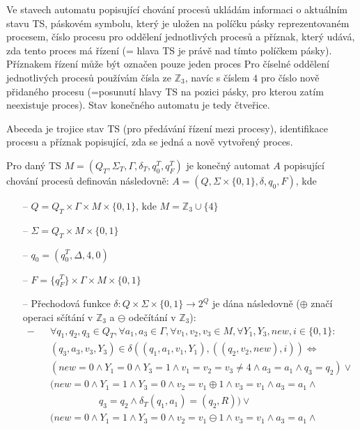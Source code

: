\documentclass[a4paper,12pt]{article}
\begin{document}
\begin{enumerate}[label=\textbf{\arabic*}.]
 Ve stavech automatu popisující chování procesů ukládám informaci o aktuálním stavu TS, páskovém 
 symbolu, který je uložen na políčku pásky reprezentovaném procesem, číslo procesu pro oddělení jednotlivých procesů a příznak, který 
 udává, zda tento proces má řízení (= hlava TS je právě nad tímto políčkem pásky).
 Příznakem řízení může být označen pouze jeden proces
 Pro číselné oddělení jednotlivých procesů používám čísla ze $\mathbb{Z}_3$, navíc s číslem $4$ pro 
 číslo nově přidaného procesu (=posunutí hlavy TS na pozici pásky, pro kterou zatím neexistuje proces). Stav konečného
 automatu je tedy čtveřice.
 
 Abeceda je trojice stav TS (pro předávání řízení mezi procesy), identifikace procesu a příznak popisující, zda
 se jedná a nově vytvořený proces.

 Pro daný TS $M = (Q_{T}, \Sigma_{T}, \Gamma, \delta_T, q^T_0, q^T_F)$ je konečný automat $A$ popisující chování procesů
 definován následovně: $A = (Q, \Sigma\times\{0,1\}, \delta, q_0, F)$, kde 
 \begin{itemize}
  \item[--] $Q = Q_{T}\times\Gamma\times M\times\{0,1\}$, kde $M = \mathbb{Z}_3\cup \{4\}$
  \item[--] $\Sigma = Q_T\times M\times\{0,1\}$
  \item[--] $q_0 = (q^T_0, \Delta, 4, 0)$
  \item[--] $F = \{q^T_F\}\times\Gamma\times M\times\{0,1\}$
  \item[--] Přechodová funkce $\delta: Q\times\Sigma\times\{0,1\}\rightarrow 2^Q$ je dána následovně ($\oplus$ značí operaci sčítání v $\mathbb{Z}_3$
   a $\ominus$ odečítání v $\mathbb{Z}_3$):
  \begin{eqnarray*}-
    &&\forall q_1, q_2, q_3 \in Q_T, \forall a_1, a_3\in\Gamma,\forall v_1, v_2, v_3\in M, \forall Y_1, Y_3, new, i \in \{0,1\}: \\
    &&(q_3, a_3, v_3, Y_3) \in \delta((q_1, a_1, v_1, Y_1), ((q_2, v_2, new), i)) \Leftrightarrow \\ 
    && (new = 0  \wedge Y_1 = 0 \wedge Y_3 = 1 \wedge v_1 = v_2 = v_3 \neq 4 \wedge a_3 = a_1 \wedge q_3 = q_2) \vee \\
    && (new = 0  \wedge Y_1 = 1 \wedge Y_3 = 0 \wedge v_2 = v_1 \oplus 1 \wedge v_3 = v_1 \wedge a_3 = a_1\wedge \\ 
    &&\quad\quad\quad\quad\quad q_3 = q_2 \wedge \delta_T(q_1, a_1) = (q_2, R)) \vee \\
    && (new = 0  \wedge Y_1 = 1 \wedge Y_3 = 0 \wedge v_2 = v_1 \ominus 1 \wedge v_3 = v_1 \wedge a_3 = a_1\wedge \\ 

\end{eqnarray*}
\end{itemize}
\end{enumerate}
\end{document}
